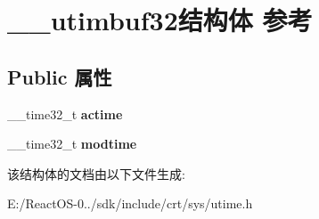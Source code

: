 \hypertarget{struct____utimbuf32}{}\section{\+\_\+\+\_\+utimbuf32结构体 参考}
\label{struct____utimbuf32}
\subsection*{Public 属性}
\begin{DoxyCompactItemize}
\item 
\mbox{\label{struct____utimbuf32_a100fffbb62f2e905e03881f7f7abb537}} 
\+\_\+\+\_\+time32\+\_\+t {\bfseries actime}
\item 
\mbox{\label{struct____utimbuf32_ac44e2b52630236229c7bf93460b1f679}} 
\+\_\+\+\_\+time32\+\_\+t {\bfseries modtime}
\end{DoxyCompactItemize}


该结构体的文档由以下文件生成\+:\begin{DoxyCompactItemize}
\item 
E\+:/\+React\+O\+S-\/0../sdk/include/crt/sys/utime.\+h\end{DoxyCompactItemize}
